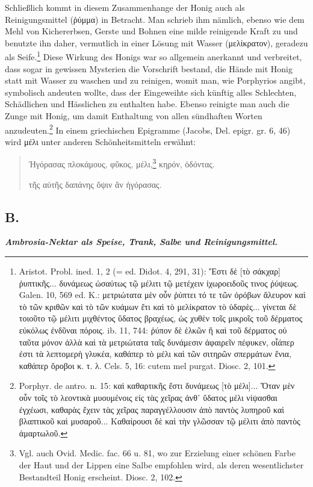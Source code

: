\documentclass[a4paper, 11pt, oneside]{article}
\begin{document}
Schließlich kommt in diesem Zusammenhange der Honig auch als Reinigungsmittel (ῥύμμα) in Betracht. Man schrieb ihm nämlich, ebenso wie dem Mehl von Kichererbsen, Gerste und Bohnen eine milde reinigende Kraft zu und benutzte ihn daher, vermutlich in einer Lösung mit Wasser (μελίκρατον), geradezu als Seife.\footnote{Aristot. Probl. ined. 1, 2 (= ed. Didot. 4, 291, 31): Ἔστι δὲ [τὸ σάκχαρ] ῤυπτικῆς... δυνάμεως ὡσαύτως τῷ μέλιτι τῷ μετέχειν ἰχωροειδοῦς τινος ῤύψεως. Galen. 10, 569 ed. K.: μετριώτατα μὲν οὖν ῥύπτει τό τε τῶν ὀρόβων ἄλευρον καὶ τὸ τῶν κριθῶν καὶ τὸ τῶν κυάμων ἔτι καὶ τὸ μελίκρατον τὸ ὑδαρὲς... γίνεται δὲ τοιοῦτο τῷ μέλιτι μιχθέντος ὕδατος βραχέως, ὡς χυθὲν τοῖς μικροῖς τοῦ δἐρματος εὐκόλως ἐνδῦναι πόροις. ib. 11, 744: ῥύπον δὲ ἑλκῶν ἢ καὶ τοῦ δέρματος οὐ ταῦτα μόνον ἀλλὰ καὶ τὰ μετριώτατα ταῖς δυνάμεσιν ἀφαιρεῖν πέφυκεν, οἶάπερ ἐστι τὰ λεπτομερὴ γλυκέα, καθάπερ τὸ μέλι καὶ τῶν σιτηρῶν σπερμάτων ἕνια, καθάπερ ὅροβοι κ. τ. λ. Cels. 5, 16: cutem mel purgat. Diosc. 2, 101.} Diese Wirkung des Honigs war so allgemein anerkannt und verbreitet, dass sogar in gewissen Mysterien die Vorschrift bestand, die Hände mit Honig statt mit Wasser zu waschen und zu reinigen, womit man, wie Porphyrios angibt, symbolisch andeuten wollte, dass der Eingeweihte sich künftig alles Schlechten, Schädlichen und Hässlichen zu enthalten habe. Ebenso reinigte man auch die Zunge mit Honig, um damit Enthaltung von allen sündhaften Worten anzudeuten.\footnote{Porphyr. de antro. n. 15: καὶ καθαρτικῆς ἔστι δυνάμεως [τὸ μέλι]... Ὅταν μὲν οὖν τοῖς τὸ λεοντικὰ μυουμένοις εἰς τὰς χεῖρας ἀνθ᾽ ὕδατος μέλι νίψασθαι ἐγχέωσι, καθαρὰς ἔχειν τὰς χεῖρας παραγγέλλουσιν ἀπὸ παντὸς λυπηροῦ καὶ βλαπτικοῦ καὶ μυσαροῦ... Καθαίρουσι δὲ καὶ τὴν γλῶσσαν τῷ μέλιτι ἀπὸ παντὸς ἁμαρτωλοῦ.} In einem griechischen Epigramme (Jacobs, Del. epigr. gr. 6, 46) wird μέλι unter anderen Schönheitsmitteln erwähnt:
\begin{quotation}
Ἠγόρασας πλοκάμους, φῦκος, μέλι,\footnote{Vgl. auch Ovid. Medic. fac. 66 u. 81, wo zur Erzielung einer schönen Farbe der Haut und der Lippen eine Salbe empfohlen wird, als deren wesentlichster Bestandteil Honig erscheint. Diosc. 2, 102.} κηρόν, ὀδόντας.

τῆς αὐτῆς δαπάνης ὄψιν ἂν ἠγόρασας.
\end{quotation}
\paragraph{}
\subsection{B.}
\begin{center}
\textbf{\emph{Ambrosia-Nektar als Speise, Trank, Salbe und Reinigungsmittel.}}
\end{center}
\end{document}
